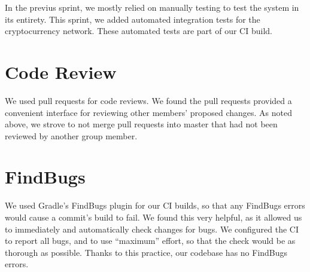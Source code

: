 \documentclass[a4paper,12pt]{article}
\begin{document}
In the previus sprint, we mostly relied on manually testing to test the system in its entirety. This sprint, we added automated integration tests for the cryptocurrency network. These automated tests are part of our CI build.

\section{Code Review}

We used pull requests for code reviews. We found the pull requests provided a convenient interface for reviewing other members' proposed changes. As noted above, we strove to not merge pull requests into master that had not been reviewed by another group member.

\section{FindBugs}

We used Gradle's FindBugs plugin for our CI builds, so that any FindBugs errors would cause a commit's build to fail. We found this very helpful, as it allowed us to immediately and automatically check changes for bugs. We configured the CI to report all bugs, and to use ``maximum'' effort, so that the check would be as thorough as possible. Thanks to this practice, our codebase has no FindBugs errors.
\end{document}
